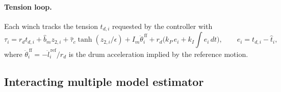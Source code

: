 \documentclass[10pt]{article}
\begin{document}
\paragraph{Tension loop.} Each winch tracks the tension $t_{d,i}$ requested by the controller with
\begin{equation}\label{eq:tensionloop}
\tau_i=r_d t_{d,i}+\hat b_m z_{2,i}+\hat\tau_c\tanh(z_{2,i}/\epsilon)+I_m\ddot\theta_i^{\,\mathrm{ff}}+r_d\Big(k_P\,e_i+k_I\!\int e_i\,dt\Big),\qquad e_i=t_{d,i}-\hat t_i ,
\end{equation}
where $\ddot\theta_i^{\,\mathrm{ff}}=-\ddot l_{i}^{\,\mathrm{ref}}/r_d$ is the drum acceleration implied by the reference motion.

\subsection{Interacting multiple model estimator}
\end{document}
